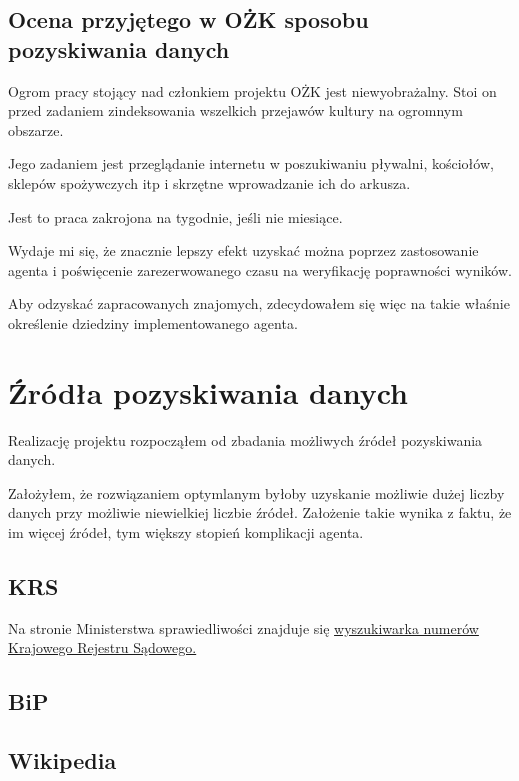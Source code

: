 \documentclass[a4 122pt]{article}
\begin{document}
		\subsection{Ocena przyjętego w OŻK sposobu pozyskiwania danych}
		
			Ogrom pracy  stojący nad członkiem projektu OŻK jest niewyobrażalny.
			Stoi on przed zadaniem zindeksowania wszelkich przejawów kultury na ogromnym obszarze.
			
			Jego zadaniem jest przeglądanie internetu w poszukiwaniu pływalni, kościołów, sklepów spożywczych itp i skrzętne wprowadzanie ich do arkusza.
			
			Jest to praca zakrojona na tygodnie, jeśli nie miesiące.
			
			Wydaje mi się, że znacznie lepszy efekt uzyskać można poprzez zastosowanie agenta i poświęcenie zarezerwowanego czasu na weryfikację poprawności wyników. 
			
			Aby odzyskać zapracowanych znajomych, zdecydowałem się więc na takie właśnie określenie dziedziny implementowanego agenta. 
	
	\section{Źródła pozyskiwania danych}
		
			Realizację projektu rozpocząłem od zbadania możliwych źródeł pozyskiwania danych.
		
			Założyłem, że rozwiązaniem optymlanym byłoby uzyskanie możliwie dużej liczby danych przy możliwie niewielkiej liczbie źródeł.
			Założenie takie wynika z faktu, że im więcej źródeł, tym większy stopień komplikacji agenta.
			
			\subsection{KRS}
			
				Na stronie Ministerstwa sprawiedliwości znajduje się \href{https://ems.ms.gov.pl/krs/wyszukiwaniepodmiotu?t:lb=t}{wyszukiwarka numerów Krajowego Rejestru Sądowego.}
		
			\subsection{BiP}
			
			\subsection{Wikipedia}
			
\end{document}
